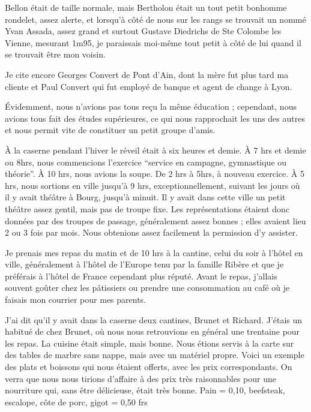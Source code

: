 \documentclass[11pt,a4paper]{report}
\begin{document}
Bellon était de taille normale, mais Bertholon était un tout petit bonhomme rondelet, assez alerte, et lorsqu'à côté de nous sur les rangs se trouvait un nommé Yvan Assada, assez grand et surtout Gustave Diedrichs de Ste Colombe les Vienne, mesurant 1m95, je paraissais moi-même tout petit à côté de lui quand il se trouvait être mon voisin.

Je cite encore Georges Convert de Pont d'Ain, dont la mère fut plus tard ma cliente et Paul Convert qui fut employé de banque et agent de change à Lyon.

Évidemment, nous n'avions pas tous reçu la même éducation ; cependant, nous avions tous fait des études supérieures, ce qui nous rapprochait les uns des autres et nous permit vite de constituer un petit groupe d'amis.

À la caserne pendant l'hiver le réveil était à six heures et demie. À 7 hrs et demie ou 8hrs, nous commencions l'exercice ``service en campagne, gymnastique ou théorie''. À 10 hrs, nous avions la soupe. De 2 hrs à 5hrs, à nouveau exercice. À 5 hrs, nous sortions en ville jusqu'à 9 hrs, exceptionnellement, suivant les jours où il y avait théâtre à Bourg, jusqu'à minuit. Il y avait dans cette ville un petit théâtre assez gentil, mais pas de troupe fixe. Les représentations étaient donc données par des troupes de passage, généralement assez bonnes ; elles avaient lieu 2 ou 3 fois par mois. Nous obtenions assez facilement la permission d'y assister.

Je prenais mes repas du matin et de 10 hrs à la cantine, celui du soir à l'hôtel en ville, généralement à l'hôtel de l'Europe tenu par la famille Ribère et que je préférais à l'hôtel de France cependant plus réputé. Avant le repas, j'allais souvent goûter chez les pâtissiers ou prendre une consommation au café où je faisais mon courrier pour mes parents.

J'ai dit qu'il y avait dans la caserne deux cantines, Brunet et Richard. J'étais un habitué de chez Brunet, où nous nous retrouvions en général une trentaine pour les repas. La cuisine était simple, mais bonne. Nous étions servis à la carte sur des tables de marbre sans nappe, mais avec un matériel propre. Voici un exemple des plats et boissons qui nous étaient offerts, avec les prix correspondants. On verra que nous nous tirions d'affaire à des prix très raisonnables pour une nourriture qui, sans être délicieuse, était très bonne. Pain = 0,10, beefsteak, escalope, côte de porc, gigot = 0,50 frs
\end{document}
